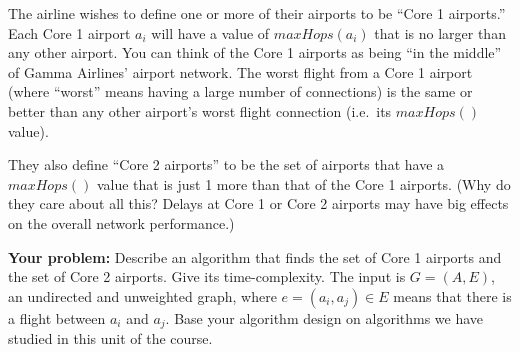 \documentclass[10pt]{article}
\begin{document}
The airline wishes to define one or more of their airports to be ``Core 1 airports.'' Each Core 1 airport $a_i$ will have a value of $maxHops(a_i)$ that is no larger than any other airport.  You can think of the Core 1 airports as being ``in the middle'' of Gamma Airlines' airport network.  The worst flight from a Core 1 airport (where ``worst'' means having a large number of connections) is the same or better than any other airport's worst flight connection (i.e.\ its $maxHops()$ value).

They also define ``Core 2 airports'' to be the set of airports that have a $maxHops()$ value that is just 1 more than that of the Core 1 airports.  (Why do they care about all this?  Delays at Core 1 or Core 2 airports may have big effects on the overall network performance.)

\textbf{Your problem: } Describe an algorithm that finds the set of Core 1 airports and the set of Core 2 airports.  Give its time-complexity.   The input is $G=(A,E)$, an undirected and unweighted graph, where $e = (a_i, a_j) \in E$ means that there is a flight between $a_i$ and $a_j$. Base your algorithm design on algorithms we have studied in this unit of the course.
\end{document}
